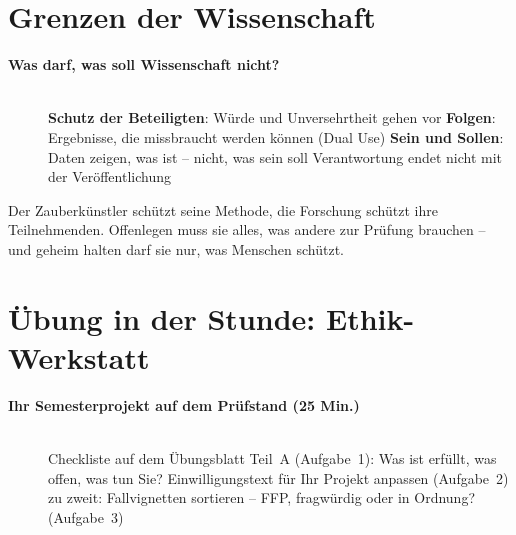 \section{Grenzen der Wissenschaft}
\begin{description}
\item[{\rot\bf Was darf, was soll Wissenschaft nicht?}]~\\[-\lblskip]
\bi
  \ite \textbf{Schutz der Beteiligten}: Würde und Unversehrtheit gehen vor
  \ite \textbf{Folgen}: Ergebnisse, die missbraucht werden können
    (Dual Use)
  \ite \textbf{Sein und Sollen}: Daten zeigen, was ist -- nicht, was sein
    soll
  \ite Verantwortung endet nicht mit der Veröffentlichung
\ei
\os{\newpage}
\end{description}

\begin{merkbox}[Forschungsethik]
Der Zauberkünstler schützt seine Methode, die Forschung schützt ihre
Teilnehmenden. Offenlegen muss sie alles, was andere zur Prüfung brauchen
-- und geheim halten darf sie nur, was Menschen schützt.
\end{merkbox}
\os{\newpage}

\section{Übung in der Stunde: Ethik-Werkstatt}
\begin{description}
\item[{\rot\bf Ihr Semesterprojekt auf dem Prüfstand (25 Min.)}]~\\[-\lblskip]
\bi
  \ite Checkliste auf dem Übungsblatt Teil~A (Aufgabe~1): Was ist erfüllt, was
    offen, was tun Sie?
  \ite Einwilligungstext für Ihr Projekt anpassen (Aufgabe~2)
  \ite zu zweit: Fallvignetten sortieren -- FFP, fragwürdig oder in
    Ordnung? (Aufgabe~3)
\ei
\os{\newpage}
\end{description}


